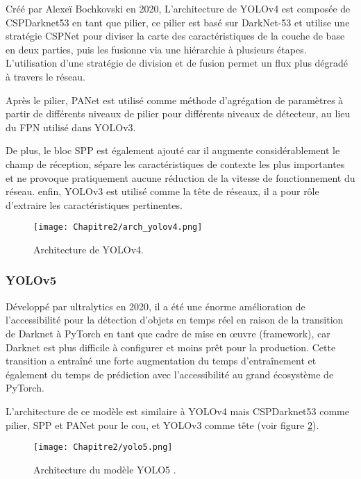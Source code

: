 Créé par Alexeï Bochkovski en 2020, L'architecture de YOLOv4 est composée de CSPDarknet53 en tant que pilier, ce pilier est basé sur DarkNet-53 et utilise une stratégie CSPNet\cite{cspnet} pour diviser la carte des caractéristiques de la couche de base en deux parties, puis les fusionne via une hiérarchie à plusieurs étapes. L'utilisation d'une stratégie de division et de fusion permet un flux plus dégradé à travers le réseau.

Après le pilier, PANet\cite{panet} est utilisé comme méthode d'agrégation de paramètres à partir de différents niveaux de pilier pour différents niveaux de détecteur, au lieu du FPN utilisé dans YOLOv3.

De plus, le bloc SPP\cite{spp} est également ajouté car il augmente considérablement le champ de réception, sépare les caractéristiques de contexte les plus importantes et ne provoque pratiquement aucune réduction de la vitesse de fonctionnement du réseau.
enfin, YOLOv3 est utilisé comme la tête de réseaux, il a pour rôle d'extraire les caractéristiques pertinentes.

\begin{figure}[H]
          \centering
          \texttt{[image: Chapitre2/arch\_yolov4.png]}
          \caption{Architecture de YOLOv4.}
          \label{img16_}
          \end{figure}

\subsubsection{YOLOv5} 
Développé par ultralytics en 2020, il a été une énorme amélioration de l'accessibilité pour la détection d'objets en temps réel en raison de la transition de Darknet à PyTorch en tant que cadre de mise en œuvre (framework), car Darknet est plus difficile à configurer et moins prêt pour la production. Cette transition a entraîné une forte augmentation du temps d'entraînement et également du temps de prédiction avec l'accessibilité au grand écosystème de PyTorch.          

L'architecture de ce modèle est similaire à YOLOv4 mais CSPDarknet53 comme pilier, SPP et PANet pour le cou, et YOLOv3 comme tête (voir figure \ref{yolo5}). 

\begin{figure}[H]
          \centering
          \texttt{[image: Chapitre2/yolo5.png]}
          \caption{Architecture du modèle YOLO5 \cite{}.}
          \label{yolo5}
          \end{figure}

